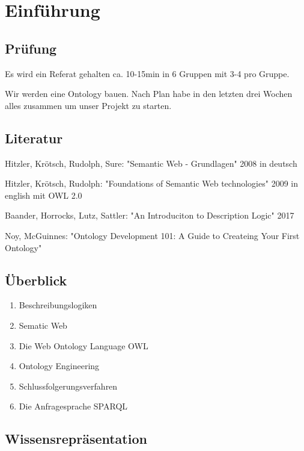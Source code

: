 \documentclass[a4paper]{article}
\title{\docTitle}
\author{Moritz}
\date{\today}
\begin{document}
\maketitle
\tableofcontents


\section{Einführung}

\subsection{Prüfung}

Es wird ein Referat gehalten ca. 10-15min in 6 Gruppen mit 3-4 pro Gruppe.

Wir werden eine Ontology bauen. Nach Plan habe in den letzten drei Wochen alles zusammen um unser Projekt zu starten.

\subsection{Literatur}

Hitzler, Krötsch, Rudolph, Sure: "Semantic Web - Grundlagen" 2008 in deutsch

Hitzler, Krötsch, Rudolph: "Foundations of Semantic Web technologies" 2009 in english mit OWL 2.0

Baander, Horrocks, Lutz, Sattler: "An Introduciton to Description Logic" 2017

Noy, McGuinnes: "Ontology Development 101: A Guide to Createing Your First Ontology" 

\subsection{Überblick}

\begin{enumerate}
    \item Beschreibungslogiken
    \item Sematic Web
    \item Die Web Ontology Language OWL
    \item Ontology Engineering
    \item Schlussfolgerungsverfahren
    \item Die Anfragesprache SPARQL
\end{enumerate}

\subsection{Wissensrepräsentation}
\end{document}
